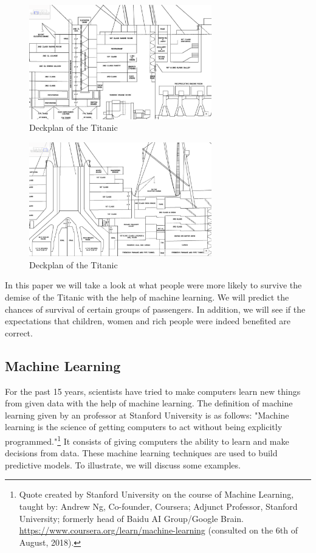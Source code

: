 \documentclass[11pt]{article}
\begin{document}
\begin{figure}[htbp]
\centering
\includegraphics[width=300px]{./Deck2.png}
\caption{\label{tab:titanicdeckplanone}
Deckplan of the Titanic}
\end{figure} 

\begin{figure}[htbp]
\centering
\includegraphics[width=300px]{./Deck3.png}
\caption{\label{tab:titanicdeckplantwo}
Deckplan of the Titanic}
\end{figure} 


In this paper we will take a look at what people were more likely to survive the demise of the Titanic with the help of machine learning. We will predict the chances of survival of certain groups of passengers. In addition, we will see if the expectations that children, women and rich people were indeed benefited are correct. 

\subsection{Machine Learning}
\label{sec:org9dbce64}
For the past 15 years, scientists have tried to make computers learn new things from given data with the help of machine learning. The definition of machine learning given by an professor at Stanford University is as follows: "Machine learning is the science of getting computers to act without being explicitly programmed."\footnote{Quote created by Stanford University on the course of Machine Learning, taught by: Andrew Ng, Co-founder, Coursera; Adjunct Professor, Stanford University; formerly head of Baidu AI Group/Google Brain. \url{https://www.coursera.org/learn/machine-learning} (consulted on the 6th of August, 2018).} It consists of giving computers the ability to learn and make decisions from data. These machine learning techniques are used to build predictive models. To illustrate, we will discuss some examples. 
\end{document}
